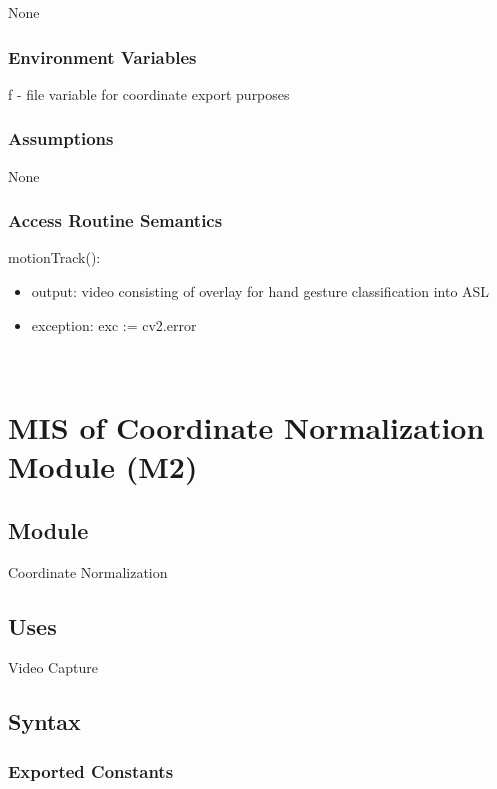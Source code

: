 \documentclass[12pt, titlepage]{article}
\begin{document}
None

\subsubsection{Environment Variables}

f - file variable for coordinate export purposes

\subsubsection{Assumptions}

None

\subsubsection{Access Routine Semantics}

\noindent motionTrack():
\begin{itemize}
\item output: video consisting of overlay for hand gesture classification into ASL\\
\item exception: exc := cv2.error
\end{itemize}

~\newpage

\section{MIS of Coordinate Normalization Module (M2)} \label{m2}

\subsection{Module}

Coordinate Normalization

\subsection{Uses}

Video Capture

\subsection{Syntax}

\subsubsection{Exported Constants}
\end{document}
